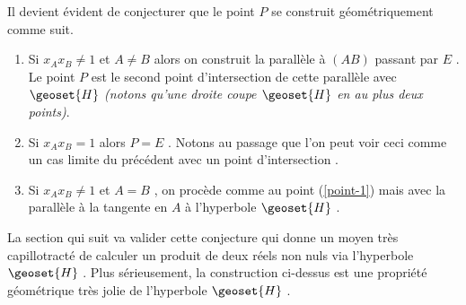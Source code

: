 \medskip

Il devient évident de conjecturer que le point $P$ se construit géométriquement comme suit.

\begin{enumerate}
	\item \label{point-1} Si $x_A x_B \neq 1$ et $A \neq B$ alors on construit la parallèle à $(AB)$ passant par $E$ . Le point $P$ est le second point d'intersection de cette parallèle avec $\geoset{H}$  \emph{(notons qu'une droite coupe $\geoset{H}$ en au plus deux points)}.

	\item Si $x_A x_B = 1$ alors $P = E$ . Notons au passage que l'on peut voir ceci comme un cas limite du précédent avec un point d'intersection .

	\item Si $x_A x_B \neq 1$ et $A = B$ , on procède comme au point (\ref{point-1}) mais avec la parallèle à la tangente en $A$ à l'hyperbole $\geoset{H}$ .
\end{enumerate}


La section qui suit va valider cette conjecture qui donne un moyen très capillotracté de calculer un produit de deux réels non nuls via l'hyperbole $\geoset{H}$ .
Plus sérieusement, la construction ci-dessus est une propriété géométrique très jolie de l'hyperbole $\geoset{H}$ .
